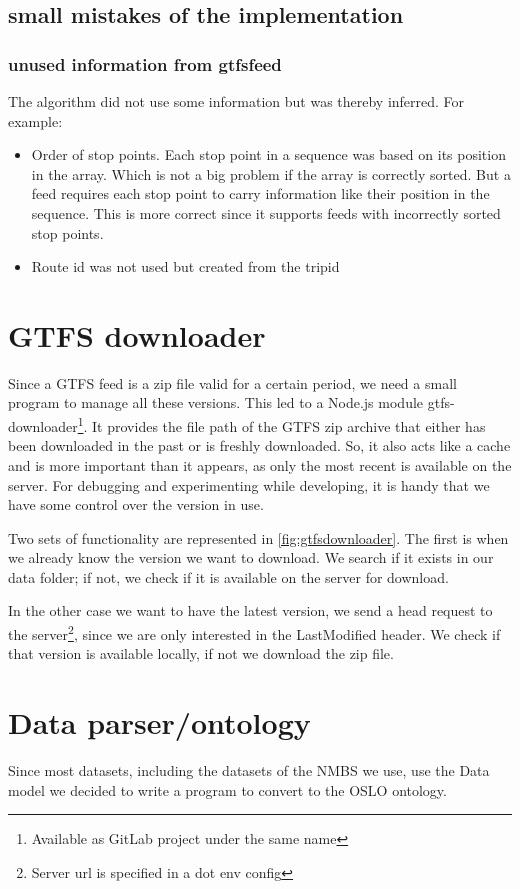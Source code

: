 \subsection{small mistakes of the implementation}
\subsubsection{unused information from gtfsfeed}
The algorithm did not use some information but was thereby inferred. For example:
\begin{itemize}
    \item Order of stop points. Each stop point in a sequence was based on its position in the array. Which is not a big problem if the array is correctly sorted. But a  feed requires each stop point to carry information like their position in the sequence. This is more correct since it supports feeds with incorrectly sorted stop points.
    \item Route id was not used but created from the tripid 
\end{itemize}
\section{GTFS downloader}
Since a GTFS feed is a zip file valid for a certain period, we need a small program to manage all these versions. This led to a Node.js module gtfs-downloader\footnote{Available as GitLab project under the same name}. It provides the file path of the GTFS zip archive that either has been downloaded in the past or is freshly downloaded. So, it also acts like a cache and is more important than it appears, as only the most recent is available on the server. For debugging and experimenting while developing, it is handy that we have some control over the version in use. 

Two sets of functionality are represented in \autoref{fig:gtfsdownloader}. The first is when we already know the version we want to download. We search if it exists in our data folder; if not, we check if it is available on the server for download.

In the other case we want to have the latest version, we send a head request to the server\footnote{Server url is specified in a dot env config}, since we are only interested in the LastModified header. We check if that version is available locally, if not we download the zip file.

\section{Data parser/ontology}\label{section:implementation_data_ontology}
Since most datasets, including the datasets of the NMBS we use, use the  Data model we decided to write a program to convert  to the OSLO ontology.


